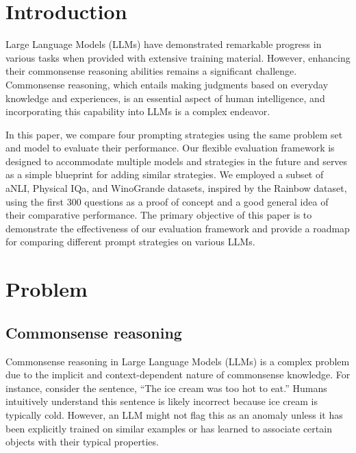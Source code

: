 \documentclass[fleqn,moreauthors,10pt]{ds_report}
\affiliation{\textit{Advisors: Aleš Žagar}}
\begin{document}
\flushbottom 

\maketitle 

\thispagestyle{empty} 


\section*{Introduction}
Large Language Models (LLMs) have demonstrated remarkable progress in various tasks when provided with extensive training material. However, enhancing their commonsense reasoning abilities remains a significant challenge. Commonsense reasoning, which entails making judgments based on everyday knowledge and experiences, is an essential aspect of human intelligence, and incorporating this capability into LLMs is a complex endeavor.

In this paper, we compare four prompting strategies using the same problem set and model to evaluate their performance. Our flexible evaluation framework is designed to accommodate multiple models and strategies in the future and serves as a simple blueprint for adding similar strategies. We employed a subset of aNLI, Physical IQa, and WinoGrande datasets, inspired by the Rainbow dataset, using the first 300 questions as a proof of concept and a good general idea of their comparative performance. The primary objective of this paper is to demonstrate the effectiveness of our evaluation framework and provide a roadmap for comparing different prompt strategies on various LLMs.

\section*{Problem}

\subsection*{Commonsense reasoning}
Commonsense reasoning in Large Language Models (LLMs) is a complex problem due to the implicit and context-dependent nature of commonsense knowledge. For instance, consider the sentence, “The ice cream was too hot to eat.” Humans intuitively understand this sentence is likely incorrect because ice cream is typically cold. However, an LLM might not flag this as an anomaly unless it has been explicitly trained on similar examples or has learned to associate certain objects with their typical properties.
\end{document}
